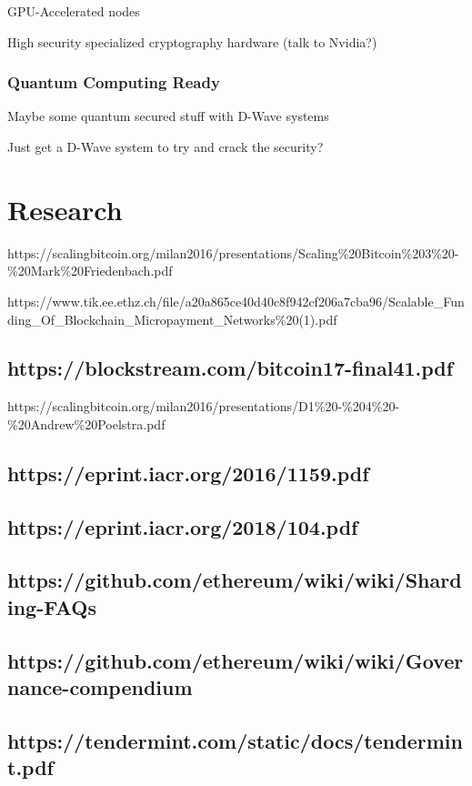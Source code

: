 \documentclass[11pt]{article}
\begin{document}
GPU-Accelerated nodes


High security specialized cryptography hardware (talk to Nvidia?)


\subsubsection{Quantum Computing Ready}

Maybe some quantum secured stuff with D-Wave systems


Just get a D-Wave system to try and crack the security?


\section{Research}

https://scalingbitcoin.org/milan2016/presentations/Scaling\%20Bitcoin\%203\%20-\%20Mark\%20Friedenbach.pdf


https://www.tik.ee.ethz.ch/file/a20a865ce40d40c8f942cf206a7cba96/Scalable\_Funding\_Of\_Blockchain\_Micropayment\_Networks\%20(1).pdf


\subsection{https://blockstream.com/bitcoin17-final41.pdf}

https://scalingbitcoin.org/milan2016/presentations/D1\%20-\%204\%20-\%20Andrew\%20Poelstra.pdf


\subsection{https://eprint.iacr.org/2016/1159.pdf}

\subsection{https://eprint.iacr.org/2018/104.pdf}

\subsection{https://github.com/ethereum/wiki/wiki/Sharding-FAQs}

\subsection{https://github.com/ethereum/wiki/wiki/Governance-compendium}

\subsection{https://tendermint.com/static/docs/tendermint.pdf}
\end{document}
